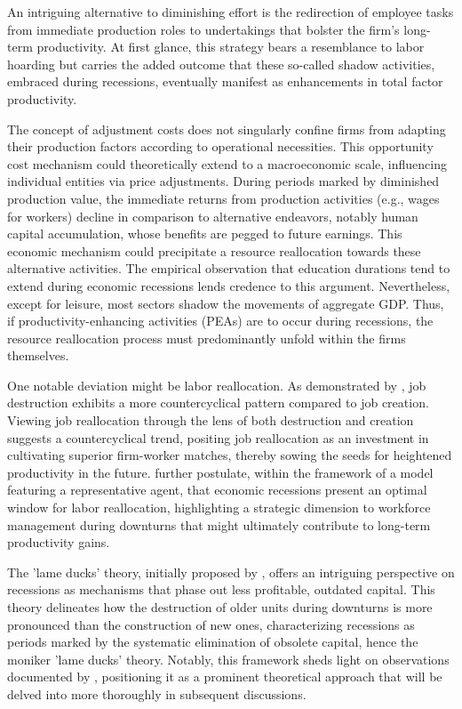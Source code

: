 \documentclass[12pt]{report}
\begin{document}
An intriguing alternative to diminishing effort is the redirection of employee tasks from immediate production roles to
undertakings that bolster the firm's long-term productivity. At first glance, this strategy bears a resemblance to labor
hoarding but carries the added outcome that these so-called shadow activities, embraced during recessions, eventually
manifest as enhancements in total factor productivity. 

The concept of adjustment costs does not singularly confine firms from adapting their production factors according to
operational necessities. This opportunity cost mechanism could theoretically extend to a macroeconomic scale,
influencing individual entities via price adjustments. During periods marked by diminished production value, the
immediate returns from production activities (e.g., wages for workers) decline in comparison to alternative endeavors,
notably human capital accumulation, whose benefits are pegged to future earnings. This economic mechanism could
precipitate a resource reallocation towards these alternative activities. The empirical observation that education
durations tend to extend during economic recessions lends credence to this argument. Nevertheless, except for
leisure, most sectors shadow the movements of aggregate GDP. Thus, if productivity-enhancing activities (PEAs) are to
occur during recessions, the resource reallocation process must predominantly unfold within the firms themselves. 

One notable deviation might be labor reallocation. As demonstrated by \cite{DavHalt92}, job destruction exhibits a
more countercyclical pattern compared to job creation. Viewing job reallocation through the lens of both destruction and
creation suggests a countercyclical trend, positing job reallocation as an investment in cultivating superior
firm-worker matches, thereby sowing the seeds for heightened productivity in the future. \cite{DavHalt92}further
postulate, within the framework of a model featuring a representative agent, that economic recessions present an optimal
window for labor reallocation, highlighting a strategic dimension to workforce management during downturns that might
ultimately contribute to long-term productivity gains. 
 
The 'lame ducks' theory, initially proposed by \cite{CabHarm94}, offers an intriguing perspective on
recessions as mechanisms that phase out less profitable, outdated capital. This theory delineates how the destruction of
older units during downturns is more pronounced than the construction of new ones, characterizing recessions as periods
marked by the systematic elimination of obsolete capital, hence the moniker 'lame ducks' theory. Notably, this framework
sheds light on observations documented by \cite{DavHalt92}, positioning it as a prominent theoretical
approach that will be delved into more thoroughly in subsequent discussions. 
\end{document}
